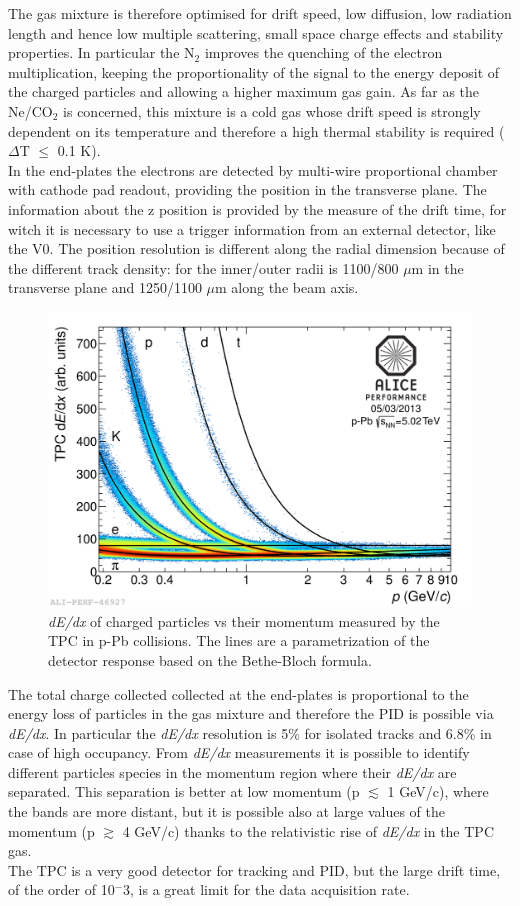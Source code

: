 The gas mixture is therefore optimised for drift speed, low diffusion, low radiation length and hence low multiple scattering, small space charge effects and stability properties. In particular the N$_2$ improves the quenching of the electron multiplication, keeping the proportionality of the signal to the energy deposit of the charged particles and allowing a higher maximum gas gain. As far as the Ne/CO$_2$ is concerned, this mixture is a cold gas whose drift speed is strongly dependent on its temperature and therefore a high thermal stability is required ($\Delta$T $\leq$ 0.1 K).\\
In the end-plates the electrons are detected by multi-wire proportional chamber with cathode pad readout, providing the position in the transverse plane. The information about the z position is provided by the measure of the drift time, for witch it is necessary to use a trigger information from an external detector, like the V0. The position resolution is different  along the radial dimension because of the different track density: for the inner/outer radii is 1100/800 $\mu$m in the transverse plane and 1250/1100 $\mu$m along the beam axis.
%
\begin{figure}
  \centering
  \includegraphics[scale=0.15]{figures/TPC_Perf.png}
  \caption{\textit{dE/dx} of charged particles vs their momentum measured by the TPC in p-Pb collisions. The lines are a parametrization of the detector response based on the Bethe-Bloch formula.}
  \label{fig:TPC_Perf}
\end{figure}
%
The total charge collected collected at the end-plates is proportional to the energy loss of particles in the gas mixture and therefore the PID is possible via \textit{dE/dx}. In particular the \textit{dE/dx} resolution is 5\% for isolated tracks and 6.8\% in case of high occupancy. From \textit{dE/dx} measurements it is possible to identify different particles species in the momentum region where their \textit{dE/dx} are separated. This separation is better at low momentum (p $\lesssim$ 1 GeV/c), where the bands are more distant, but it is possible also at large values of the momentum (p $\gtrsim$ 4 GeV/c) thanks to the relativistic rise of \textit{dE/dx} in the TPC gas.\\
The TPC is a very good detector for tracking and PID, but the large drift time, of the order of 10$^-3$, is a great limit for the data acquisition rate.\\
